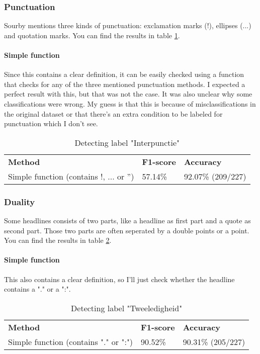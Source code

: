 \documentclass{article}
\begin{document}
\subsubsection{Punctuation}
Sourby mentions three kinds of punctuation: exclamation marks (!), ellipses (...) and quotation marks. You can find the results in table \ref{tab:punctuation}.

\paragraph{Simple function} Since this contains a clear definition, it can be easily checked using a function that checks for any of the three mentioned punctuation methods. I expected a perfect result with this, but that was not the case. It was also unclear why some classifications were wrong. My guess is that this is because of misclassifications in the original dataset or that there's an extra condition to be labeled for punctuation which I don't see.

\begin{table}
\begin{tabular}{lll}
\textbf{Method}                          & \textbf{F1-score} & \textbf{Accuracy} \\
Simple function (contains !, ... or '') & 57.14\%           & 92.07\% (209/227)
\end{tabular}
\caption{Detecting label "Interpunctie"}
\label{tab:punctuation}
\end{table}

\subsubsection{Duality}
Some headlines consists of two parts, like a headline as first part and a quote as second part. Those two parts are often seperated by a double points or a point. \cite{soubry} You can find the results in table \ref{tab:duality}.

\paragraph{Simple function} This also contains a clear definition, so I'll just check whether the headline contains a "." or a ":".

\begin{table}
\begin{tabular}{lll}
\textbf{Method}                          & \textbf{F1-score} & \textbf{Accuracy} \\
Simple function (contains "." or ":") & 90.52\%           & 90.31\% (205/227)
\end{tabular}
\caption{Detecting label "Tweeledigheid"}
\label{tab:duality}
\end{table}
\end{document}
